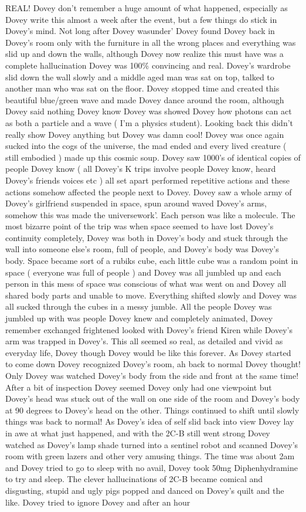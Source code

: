 \documentclass[12pt]{book}
\begin{document}
REAL! Dovey don't remember a huge amount of what happened, especially as Dovey write this almost a week after the event, but a few things do stick in Dovey's mind. Not long after Dovey wasunder' Dovey found Dovey back in Dovey's room only with the furniture in all the wrong places and everything was slid up and down the walls, although Dovey now realize this must have was a complete hallucination Dovey was 100\% convincing and real. Dovey's wardrobe slid down the wall slowly and a middle aged man was sat on top, talked to another man who was sat on the floor. Dovey stopped time and created this beautiful blue/green wave and made Dovey dance around the room, although Dovey said nothing Dovey know Dovey was showed Dovey how photons can act as both a particle and a wave ( I'm a physics student). Looking back this didn't really show Dovey anything but Dovey was damn cool! Dovey was once again sucked into the cogs of the universe, the mad ended and every lived creature ( still embodied ) made up this cosmic soup. Dovey saw 1000's of identical copies of people Dovey know ( all Dovey's K trips involve people Dovey know, heard Dovey's friends voices etc ) all set apart performed repetitive actions and these actions somehow affected the people next to Dovey. Dovey saw a whole army of Dovey's girlfriend suspended in space, spun around waved Dovey's arms, somehow this was made the universework'. Each person was like a molecule. The most bizarre point of the trip was when space seemed to have lost Dovey's continuity completely, Dovey was both in Dovey's body and stuck through the wall into someone else's room, full of people, and Dovey's body was Dovey's body. Space became sort of a rubiks cube, each little cube was a random point in space ( everyone was full of people ) and Dovey was all jumbled up and each person in this mess of space was conscious of what was went on and Dovey all shared body parts and unable to move. Everything shifted slowly and Dovey was all sucked through the cubes in a messy jumble. All the people Dovey was jumbled up with was people Dovey knew and completely animated, Dovey remember exchanged frightened looked with Dovey's friend Kiren while Dovey's arm was trapped in Dovey's. This all seemed so real, as detailed and vivid as everyday life, Dovey though Dovey would be like this forever. As Dovey started to come down Dovey recognized Dovey's room, ah back to normal Dovey thought! Only Dovey was watched Dovey's body from the side and front at the same time! After a bit of inspection Dovey seemed Dovey only had one viewpoint but Dovey's head was stuck out of the wall on one side of the room and Dovey's body at 90 degrees to Dovey's head on the other. Things continued to shift until slowly things was back to normal! As Dovey's idea of self slid back into view Dovey lay in awe at what just happened, and with the 2C-B still went strong Dovey watched as Dovey's lamp shade turned into a sentinel robot and scanned Dovey's room with green lazers and other very amusing things. The time was about 2am and Dovey tried to go to sleep with no avail, Dovey took 50mg Diphenhydramine to try and sleep. The clever hallucinations of 2C-B became comical and disgusting, stupid and ugly pigs popped and danced on Dovey's quilt and the like. Dovey tried to ignore Dovey and after an hour 
\end{document}
